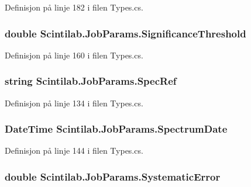 Definisjon på linje 182 i filen Types.\+cs.

\hypertarget{class_scintilab_1_1_job_params_aed6e5e005c0907a9be1baf519cf97ea0}{
\subsubsection[{Significance\+Threshold}]{\setlength{\rightskip}{0pt plus 5cm}double Scintilab.\+Job\+Params.\+Significance\+Threshold}}\label{class_scintilab_1_1_job_params_aed6e5e005c0907a9be1baf519cf97ea0}


Definisjon på linje 160 i filen Types.\+cs.

\hypertarget{class_scintilab_1_1_job_params_ac1fe41f7d25ce43fe660d0d3400fc879}{
\subsubsection[{Spec\+Ref}]{\setlength{\rightskip}{0pt plus 5cm}string Scintilab.\+Job\+Params.\+Spec\+Ref}}\label{class_scintilab_1_1_job_params_ac1fe41f7d25ce43fe660d0d3400fc879}


Definisjon på linje 134 i filen Types.\+cs.

\hypertarget{class_scintilab_1_1_job_params_ae4e318fc2c9f21edab93ecbe7a7ae123}{
\subsubsection[{Spectrum\+Date}]{\setlength{\rightskip}{0pt plus 5cm}Date\+Time Scintilab.\+Job\+Params.\+Spectrum\+Date}}\label{class_scintilab_1_1_job_params_ae4e318fc2c9f21edab93ecbe7a7ae123}


Definisjon på linje 144 i filen Types.\+cs.

\hypertarget{class_scintilab_1_1_job_params_a555911d254285940808f15da0d1c34f6}{
\subsubsection[{Systematic\+Error}]{\setlength{\rightskip}{0pt plus 5cm}double Scintilab.\+Job\+Params.\+Systematic\+Error}}\label{class_scintilab_1_1_job_params_a555911d254285940808f15da0d1c34f6}


